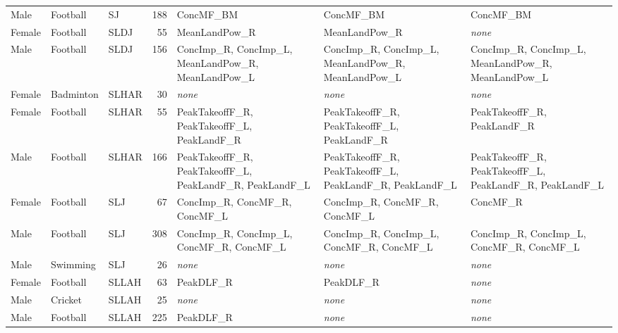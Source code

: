 {\begin{longtable}{lllrp{3.2cm}p{3.2cm}p{3.2cm}}
\addlinespace[1pt]
Male & Football & SJ & 188 & ConcMF\_BM & ConcMF\_BM & ConcMF\_BM \\
\addlinespace[1pt]
Female & Football & SLDJ & 55 & MeanLandPow\_R & MeanLandPow\_R & \emph{none} \\
Male & Football & SLDJ & 156 & ConcImp\_R, ConcImp\_L, MeanLandPow\_R, MeanLandPow\_L & ConcImp\_R, ConcImp\_L, MeanLandPow\_R, MeanLandPow\_L & ConcImp\_R, ConcImp\_L, MeanLandPow\_R, MeanLandPow\_L \\
\addlinespace[1pt]
Female & Badminton & SLHAR & 30 & \emph{none} & \emph{none} & \emph{none} \\
Female & Football & SLHAR & 55 & PeakTakeoffF\_R, PeakTakeoffF\_L, PeakLandF\_R & PeakTakeoffF\_R, PeakTakeoffF\_L, PeakLandF\_R & PeakTakeoffF\_R, PeakLandF\_R \\
Male & Football & SLHAR & 166 & PeakTakeoffF\_R, PeakTakeoffF\_L, PeakLandF\_R, PeakLandF\_L & PeakTakeoffF\_R, PeakTakeoffF\_L, PeakLandF\_R, PeakLandF\_L & PeakTakeoffF\_R, PeakTakeoffF\_L, PeakLandF\_R, PeakLandF\_L \\
\addlinespace[1pt]
Female & Football & SLJ & 67 & ConcImp\_R, ConcMF\_R, ConcMF\_L & ConcImp\_R, ConcMF\_R, ConcMF\_L & ConcMF\_R \\
Male & Football & SLJ & 308 & ConcImp\_R, ConcImp\_L, ConcMF\_R, ConcMF\_L & ConcImp\_R, ConcImp\_L, ConcMF\_R, ConcMF\_L & ConcImp\_R, ConcImp\_L, ConcMF\_R, ConcMF\_L \\
Male & Swimming & SLJ & 26 & \emph{none} & \emph{none} & \emph{none} \\
\addlinespace[1pt]
Female & Football & SLLAH & 63 & PeakDLF\_R & PeakDLF\_R & \emph{none} \\
Male & Cricket & SLLAH & 25 & \emph{none} & \emph{none} & \emph{none} \\
Male & Football & SLLAH & 225 & PeakDLF\_R & \emph{none} & \emph{none} \\
\end{longtable}
}
